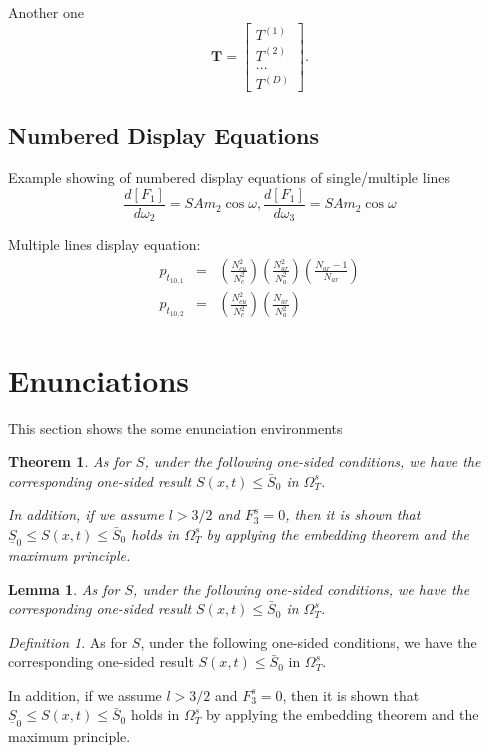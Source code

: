 \documentclass{itor}
\newtheorem{theorem}{Theorem}
\newtheorem{lemma}{Lemma}
\theoremstyle{definition}
\theoremstyle{remark}
\newtheorem{definition}{Definition}
\begin{document}
\noindent Another one
\[
\mathbf{T}=
\left[\begin{array}{c}
T^{(1)}\\
T^{(2)}\\
...\\
T^{(D)}
\end{array}\right].
\]

\subsection{Numbered Display Equations}
Example showing of numbered display equations of single/multiple lines
\begin{equation}
\frac{d[F_1]}{d\omega_2} = SAm_2\cos\omega,\frac{d[F_1]}{d\omega_3}= SAm_2\cos\omega
\end{equation}

\noindent Multiple lines display equation:
\begin{eqnarray}
p_{t_{10,1}}&=&\left(\frac{N_{cu}^2}{ N_c ^2}\right)\left(\frac{N_{ar}^2}{N_a^2}\right)\left(\frac{N_{ar}-1}{N_{ar}}\right)\\
p_{t_{10,2}}&=&\left(\frac{N_{cu}^2}{ N_c ^2}\right)\left(\frac{N_{ar}}{N_a^2}\right)
\end{eqnarray}

\section{Enunciations}
This section shows the some enunciation environments
\begin{theorem}
As for $S$, under the following one-sided conditions, we have the corresponding one-sided result
$S(x,t) \leq \bar{S}_0$ in $\Omega_T^s$.%

In addition, if we assume $l > 3/2$ and $F_3^s = 0$, then it is shown that $\underline{S}_0 \leq S(x,t) \leq \bar{S}_0$ holds in $\Omega_T^s$ by applying the embedding theorem and the maximum principle.
\end{theorem}

\begin{lemma}
As for $S$, under the following one-sided conditions, we have the corresponding one-sided result
$S(x,t) \leq \bar{S}_0$ in $\Omega_T^s$.%
\end{lemma}

\begin{definition}
As for $S$, under the following one-sided conditions, we have the corresponding one-sided result
$S(x,t) \leq \bar{S}_0$ in $\Omega_T^s$.%

In addition, if we assume $l > 3/2$ and $F_3^s = 0$, then it is shown that $\underline{S}_0 \leq S(x,t) \leq \bar{S}_0$ holds in $\Omega_T^s$ by applying the embedding theorem and the maximum principle.
\end{definition}
\end{document}

